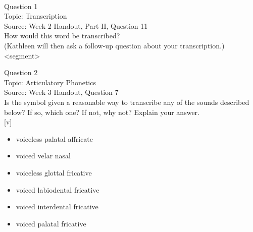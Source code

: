 \documentclass[12pt]{article}
\begin{document}
\newpage

\begin{center}
\textbf{{\color{red}{\HUGE END OF EXAM}}}\\

\end{center}
\newpage

\begin{center}
\textbf{{\color{blue}{\HUGE START OF EXAM\\}}}

\textbf{{\color{blue}{\HUGE Student ID: 22413\\}}}

\textbf{{\color{blue}{\HUGE \\}}}

\end{center}
\newpage

{\large Question 1}\\

Topic: Transcription\\
Source: Week 2 Handout, Part II, Question 11\\

How would this word be transcribed?\\ (Kathleen will then ask a follow-up question about your transcription.)\\

<segment>


\newpage

{\large Question 2}\\

Topic: Articulatory Phonetics\\
Source: Week 3 Handout, Question 7\\

Is the symbol given a reasonable way to transcribe any of the sounds described below? If so, which one? If not, why not? Explain your answer.\\

{[v]}

\begin{itemize} \item voiceless palatal affricate \item voiced velar nasal \item voiceless glottal fricative \item voiced labiodental fricative \item voiced interdental fricative \item voiced palatal fricative \end{itemize}
\end{document}
